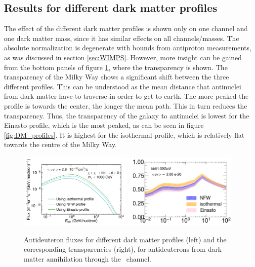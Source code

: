 \subsection{Results for different dark matter profiles}\label{sec:ResDMProfiles}
The effect of the different dark matter profiles is shown only on one channel and one dark matter mass, since it has similar effects on all channels/masses. The absolute normalization is degenerate with bounds from antiproton measurements, as was discussed in section \ref{sec:WIMPS}. However, more insight can be gained from the bottom panels of figure \ref{fig:different_DM_profiles_and_transparencies}, where the transparency is shown. The transparency of the Milky Way shows a significant shift between the three different profiles. This can be understood as the mean distance that antinuclei from dark matter have to traverse in order to get to earth. The more peaked the profile is towards the center, the longer the mean path. This in turn reduces the transparency. Thus, the transparency of the galaxy to antinuclei is lowest for the Einasto profile, which is the most peaked, as can be seen in figure \ref{fig:DM_profiles}. It is highest for the isothermal profile, which is relatively flat towards the centre of the Milky Way. 

\begin{figure}[hbtp]
    \centering
    \includegraphics[width=0.49\textwidth]{figures/bbdbarPaperLISDiffProfiles.pdf}
    \includegraphics[width=0.49\textwidth]{figures/Transparency_comparison_DM_profiles_bb51GeV_DMXs_option_nominal.png}
    \caption{Antideuteron fluxes for different dark matter profiles (left) and the corresponding transparencies (right), for antideuterons from dark matter annihilation through the \bb\ channel.}
    \label{fig:different_DM_profiles_and_transparencies}
\end{figure}

